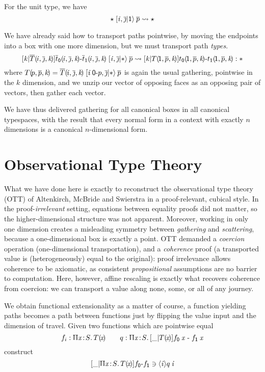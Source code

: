 \documentclass{article}
\begin{document}
For the unit type, we have
\[
\xp{\vi,\jj}{\UN}{\vd}\:\myv p \leadsto \vd
\]

We have already said how to transport paths pointwise, by moving the endpoints into a
box with one more dimension, but we must transport path \emph{types}.
\[
\xp{\vi,\jj}{\TY}{\INR\vk{\myv T\sv{\vi,\jj,\vk}}
                  {\ra{\sze {\myv t}\sv{\vi,\jj,\vk}}{\sun {\myv t}\sv{\vi,\jj,\vk}}}}
  \:\myv p \leadsto
\INR\vk{T\sv{\pun,\myv p,\vk}}{\ra{\sze t\sv{\pun,\myv p,\vk}}{\sun t\sv{\pun,\myv p,\vk}}}
: \TY
\]
where $T\sv{p,\myv p,k} = \xp{\vi\:\ra\pze p,\jj}{\TY}{\myv T\sv{\vi,\jj,\vk}}\:\myv p$
is again the usual gathering, pointwise in the $k$ dimension, and we unzip our
vector of opposing faces as an opposing pair of vectors, then gather each vector.

We have thus delivered gathering for all canonical boxes in all canonical typespaces,
with the result that every normal form in a context with exactly $n$ dimensions is a
canonical $n$-dimensional form.


\section{Observational Type Theory}

What we have done here is exactly to reconstruct the observational type theory (OTT) of Altenkirch, McBride and Swierstra in a proof-relevant, cubical style. In the proof-\emph{irrelevant} setting, equations between equality proofs did not matter,
so the higher-dimensional structure was not apparent. Moreover, working in only one
dimension creates a misleading symmetry between \emph{gathering} and \emph{scattering},
because a one-dimensional box is exactly a point. OTT demanded a
\emph{coercion} operation (one-dimensional transportation), and a \emph{coherence} proof
(a transported value is (heterogeneously) equal to the original): proof irrelevance
allows coherence to be axiomatic, as consistent \emph{propositional} assumptions are
no barrier to computation. Here, however, affine rescaling is exactly what recovers
coherence from coercion: we can transport a value along none, some, or all of any journey.

We obtain functional extensionality as a matter of course, a function yielding paths becomes a path between functions just by flipping the value input and the dimension of travel. Given
two functions which are pointwise equal
\[
f_i:\PI\vx S T\sv\vx \qquad
q:\PI\vx S \INR\_{T\sv\vx}{\ra{\sze f\:\vx\;}{\;\sun f\:\vx}}
\]
construct
\[
\INR\_{\PI\vx S T\sv\vx}{\rai f} \ni
\inr\vi{q\:\vi}
\]
\end{document}
